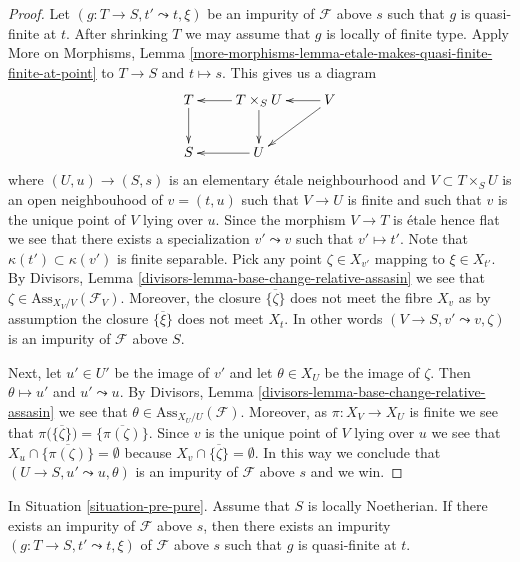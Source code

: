 \begin{proof}
Let $(g : T \to S, t' \leadsto t, \xi)$ be an impurity of
$\mathcal{F}$ above $s$ such that $g$ is quasi-finite at $t$.
After shrinking $T$ we may assume that $g$ is locally of finite type.
Apply
More on Morphisms,
Lemma \ref{more-morphisms-lemma-etale-makes-quasi-finite-finite-at-point}
to $T \to S$ and $t \mapsto s$. This gives us a diagram
$$
\xymatrix{
T \ar[d] & T \times_S U \ar[l] \ar[d] & V \ar[l] \ar[ld] \\
S & U \ar[l]
}
$$
where $(U, u) \to (S, s)$ is an elementary \'etale neighbourhood
and $V \subset T \times_S U$ is an open neighbouhood of $v = (t, u)$
such that $V \to U$ is finite and such that $v$ is the unique point of $V$
lying over $u$. Since the morphism $V \to T$ is \'etale
hence flat we see that there exists a specialization $v' \leadsto v$ such
that $v' \mapsto t'$. Note that $\kappa(t') \subset \kappa(v')$
is finite separable. Pick any point $\zeta \in X_{v'}$ mapping to
$\xi \in X_{t'}$. By
Divisors, Lemma \ref{divisors-lemma-base-change-relative-assasin}
we see that $\zeta \in \text{Ass}_{X_V/V}(\mathcal{F}_V)$.
Moreover, the closure $\overline{\{\zeta\}}$ does not meet
the fibre $X_v$ as by assumption the closure $\overline{\{\xi\}}$
does not meet $X_t$. In other words $(V \to S, v' \leadsto v, \zeta)$
is an impurity of $\mathcal{F}$ above $S$.

\medskip\noindent
Next, let $u' \in U'$ be the image of $v'$ and let
$\theta \in X_U$ be the image of $\zeta$.
Then $\theta \mapsto u'$ and $u' \leadsto u$.
By
Divisors, Lemma \ref{divisors-lemma-base-change-relative-assasin}
we see that $\theta \in \text{Ass}_{X_U/U}(\mathcal{F})$.
Moreover, as $\pi : X_V \to X_U$ is finite we see that
$\pi\big(\overline{\{\zeta\}}\big) = \overline{\{\pi(\zeta)\}}$. Since
$v$ is the unique point of $V$ lying over $u$ we see that
$X_u \cap \overline{\{\pi(\zeta)\}} = \emptyset$ because
$X_v \cap \overline{\{\zeta\}} = \emptyset$. In this way we conclude that
$(U \to S, u' \leadsto u, \theta)$ is an impurity of
$\mathcal{F}$ above $s$ and we win.
\end{proof}

\begin{lemma}
\label{lemma-Noetherian-impurity-quasi-finite}
In Situation \ref{situation-pre-pure}.
Assume that $S$ is locally Noetherian.
If there exists an impurity of $\mathcal{F}$ above $s$, then
there exists an impurity $(g : T \to S, t' \leadsto t, \xi)$
of $\mathcal{F}$ above $s$ such that $g$ is quasi-finite at $t$.
\end{lemma}

